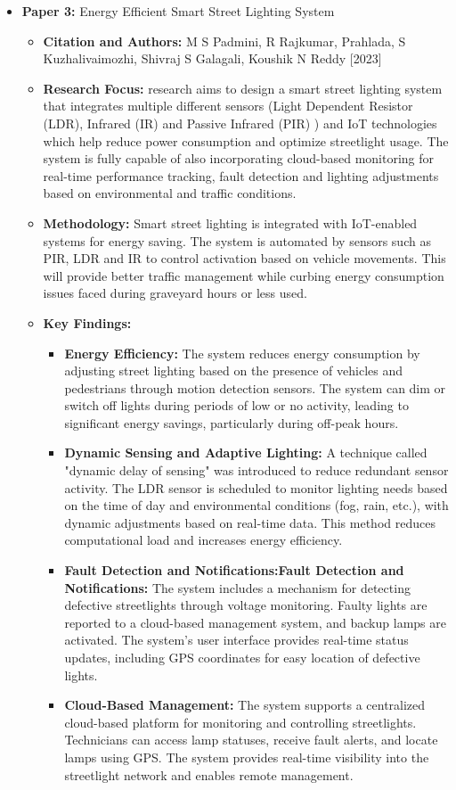 \documentclass[12pt,a4paper]{article}
\begin{document}
\begin{itemize}
    \item \textbf{Paper 3:} Energy Efficient Smart Street Lighting System
    
    \begin{itemize}
        \item \textbf{Citation and Authors:} M S Padmini, R Rajkumar, Prahlada, S Kuzhalivaimozhi, Shivraj S Galagali, Koushik N Reddy [2023] 
        \item \textbf{Research Focus:} research aims to design a smart street lighting system that integrates multiple different sensors (Light Dependent Resistor (LDR), Infrared (IR) and Passive Infrared (PIR) ) and IoT technologies which help reduce power consumption and optimize streetlight usage. The system is fully capable of also incorporating cloud-based monitoring for real-time performance tracking, fault detection and lighting adjustments based on environmental and traffic conditions.
        \item \textbf{Methodology:} Smart street lighting is integrated with IoT-enabled systems for energy saving. The system is automated by sensors such as PIR, LDR and IR to control activation based on vehicle movements. This will provide better traffic management while curbing energy consumption issues faced during graveyard hours or less used. 
        \item \textbf{Key Findings:} 
        \begin{itemize}
            \item \textbf{Energy Efficiency:} The system reduces energy consumption by adjusting street lighting based on the presence of vehicles and pedestrians through motion detection sensors. The system can dim or switch off lights during periods of low or no activity, leading to significant energy savings, particularly during off-peak hours. 
            \item \textbf{Dynamic Sensing and Adaptive Lighting:} A technique called "dynamic delay of sensing" was introduced to reduce redundant sensor activity. The LDR sensor is scheduled to monitor lighting needs based on the time of day and environmental conditions (fog, rain, etc.), with dynamic adjustments based on real-time data. This method reduces computational load and increases energy efficiency.
            \item \textbf{Fault Detection and Notifications:Fault Detection and Notifications:} The system includes a mechanism for detecting defective streetlights through voltage monitoring. Faulty lights are reported to a cloud-based management system, and backup lamps are activated. The system’s user interface provides real-time status updates, including GPS coordinates for easy location of defective lights. 
            \item \textbf{Cloud-Based Management:} The system supports a centralized cloud-based platform for monitoring and controlling streetlights. Technicians can access lamp statuses, receive fault alerts, and locate lamps using GPS. The system provides real-time visibility into the streetlight network and enables remote management. 
        \end{itemize}
    \end{itemize}


\end{itemize}
\end{document}
